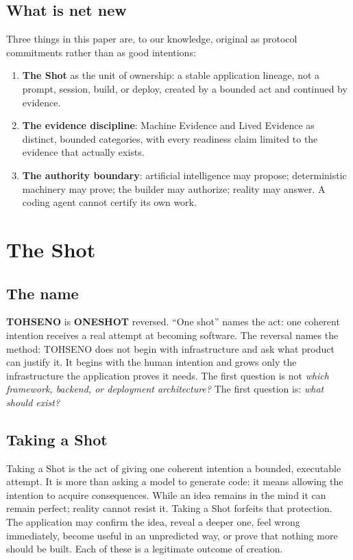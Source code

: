 \documentclass[11pt]{article}
\newcommand{\TOH}{TOHSENO}
\begin{document}
\subsection{What is net new}

Three things in this paper are, to our knowledge, original as protocol
commitments rather than as good intentions:

\begin{enumerate}
\item \textbf{The Shot} as the unit of ownership: a stable application
lineage, not a prompt, session, build, or deploy, created by a bounded
act and continued by evidence.
\item \textbf{The evidence discipline}: Machine Evidence and Lived
Evidence as distinct, bounded categories, with every readiness claim
limited to the evidence that actually exists.
\item \textbf{The authority boundary}: artificial intelligence may
propose; deterministic machinery may prove; the builder may authorize;
reality may answer. A coding agent cannot certify its own work.
\end{enumerate}

\section{The Shot}

\subsection{The name}

\textbf{\TOH{}} is \textbf{ONESHOT} reversed. ``One shot'' names the
act: one coherent intention receives a real attempt at becoming
software. The reversal names the method: \TOH{} does not begin with
infrastructure and ask what product can justify it. It begins with the
human intention and grows only the infrastructure the application proves
it needs. The first question is not \emph{which framework, backend, or
deployment architecture?} The first question is: \emph{what should
exist?}

\subsection{Taking a Shot}

Taking a Shot is the act of giving one coherent intention a bounded,
executable attempt. It is more than asking a model to generate code: it
means allowing the intention to acquire consequences. While an idea
remains in the mind it can remain perfect; reality cannot resist it.
Taking a Shot forfeits that protection. The application may confirm the
idea, reveal a deeper one, feel wrong immediately, become useful in an
unpredicted way, or prove that nothing more should be built. Each of
these is a legitimate outcome of creation.
\end{document}
